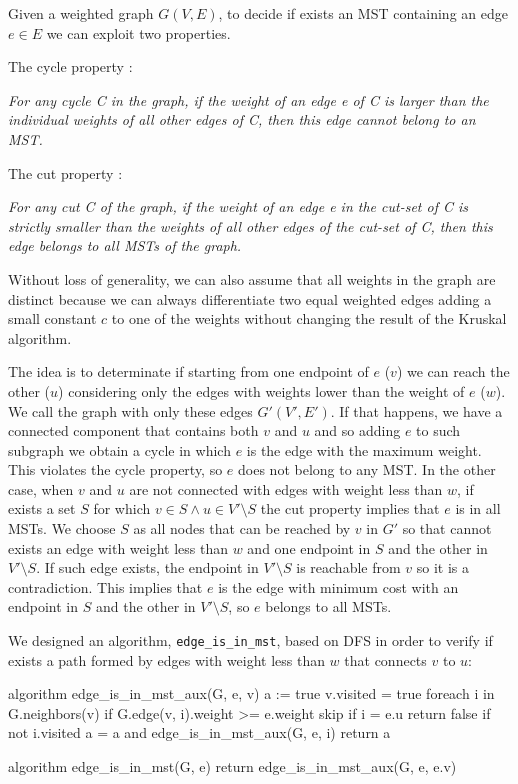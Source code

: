 \documentclass[paper=a4, fontsize=11pt]{scrartcl} %
\numberwithin{equation}{section} %
\numberwithin{figure}{section} %
\numberwithin{table}{section} %
\begin{document}
Given a weighted graph $G(V, E)$, to decide if exists an MST containing an edge $e \in E$ we can exploit two properties.

The cycle property \cite{cicle_prop}:

\bigskip
{\em For any cycle C in the graph, if the weight of an edge e of C is larger than the individual weights of all other edges of C, then this edge cannot belong to an MST.} 
\bigskip

The cut property \cite{cut_prop}:

\bigskip
{\em For any cut C of the graph, if the weight of an edge e in the cut-set of C is strictly smaller than the weights of all other edges of the cut-set of C, then this edge belongs to all MSTs of the graph.} 
\bigskip

Without loss of generality, we can also assume that all weights in the graph are distinct because we can always differentiate two equal weighted edges adding a small constant $c$ to one of the weights without changing the result of the Kruskal algorithm.

The idea is to determinate if starting from one endpoint of $e$ ($v$) we can reach the other ($u$) considering only the edges with weights lower than the weight of $e$ ($w$).
We call the graph with only these edges $G'(V', E')$.
If that happens, we have a connected component that contains both $v$ and $u$ and so adding $e$ to such subgraph we obtain a cycle in which $e$ is the edge with the maximum weight. This violates the cycle property, so $e$ does not belong to any MST.
In the other case, when $v$ and $u$ are not connected with edges with weight less than $w$, if exists a set $S$ for which $v \in S \land u \in V' \setminus S$ the cut property implies that $e$ is in all MSTs.
We choose $S$ as all nodes that can be reached by $v$ in $G'$ so that cannot exists an edge with weight less than $w$ and one endpoint in $S$ and the other in $V' \setminus S$. If such edge exists, the endpoint in $V' \setminus S$ is reachable from $v$ so it is a contradiction.
This implies that $e$ is the edge with minimum cost with an endpoint in $S$ and the other in $V' \setminus S$, so $e$ belongs to all MSTs.

We designed an algorithm, \verb|edge_is_in_mst|, based on DFS in order to verify if exists a path formed by edges with weight less than $w$ that connects $v$ to $u$:

\begin{pseudo}
algorithm edge_is_in_mst_aux(G, e, v)
    a := true
    v.visited = true
    foreach i in G.neighbors(v)
        if G.edge(v, i).weight >= e.weight
            skip
        if i = e.u
            return false
        if not i.visited
            a = a and edge_is_in_mst_aux(G, e, i)
    return a
\end{pseudo}
\begin{pseudo}
algorithm edge_is_in_mst(G, e)
    return edge_is_in_mst_aux(G, e, e.v)
\end{pseudo}
\end{document}

